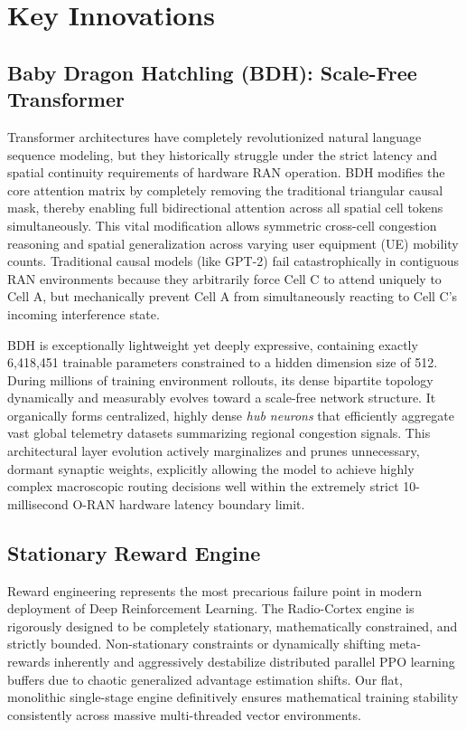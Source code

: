 \documentclass[12pt,a4paper]{article}
\begin{document}
\section{Key Innovations}

\subsection{Baby Dragon Hatchling (BDH): Scale-Free Transformer}

Transformer architectures have completely revolutionized natural language sequence modeling, but they historically struggle under the strict latency and spatial continuity requirements of hardware RAN operation. BDH modifies the core attention matrix by completely removing the traditional triangular causal mask, thereby enabling full bidirectional attention across all spatial cell tokens simultaneously. This vital modification allows symmetric cross-cell congestion reasoning and spatial generalization across varying user equipment (UE) mobility counts. Traditional causal models (like GPT-2) fail catastrophically in contiguous RAN environments because they arbitrarily force Cell C to attend uniquely to Cell A, but mechanically prevent Cell A from simultaneously reacting to Cell C's incoming interference state.

BDH is exceptionally lightweight yet deeply expressive, containing exactly 6,418,451 trainable parameters constrained to a hidden dimension size of 512. During millions of training environment rollouts, its dense bipartite topology dynamically and measurably evolves toward a scale-free network structure. It organically forms centralized, highly dense \textit{hub neurons} that efficiently aggregate vast global telemetry datasets summarizing regional congestion signals. This architectural layer evolution actively marginalizes and prunes unnecessary, dormant synaptic weights, explicitly allowing the model to achieve highly complex macroscopic routing decisions well within the extremely strict 10-millisecond O-RAN hardware latency boundary limit.

\subsection{Stationary Reward Engine}

Reward engineering represents the most precarious failure point in modern deployment of Deep Reinforcement Learning. The Radio-Cortex engine is rigorously designed to be completely stationary, mathematically constrained, and strictly bounded. Non-stationary constraints or dynamically shifting meta-rewards inherently and aggressively destabilize distributed parallel PPO learning buffers due to chaotic generalized advantage estimation shifts. Our flat, monolithic single-stage engine definitively ensures mathematical training stability consistently across massive multi-threaded vector environments.
\end{document}
